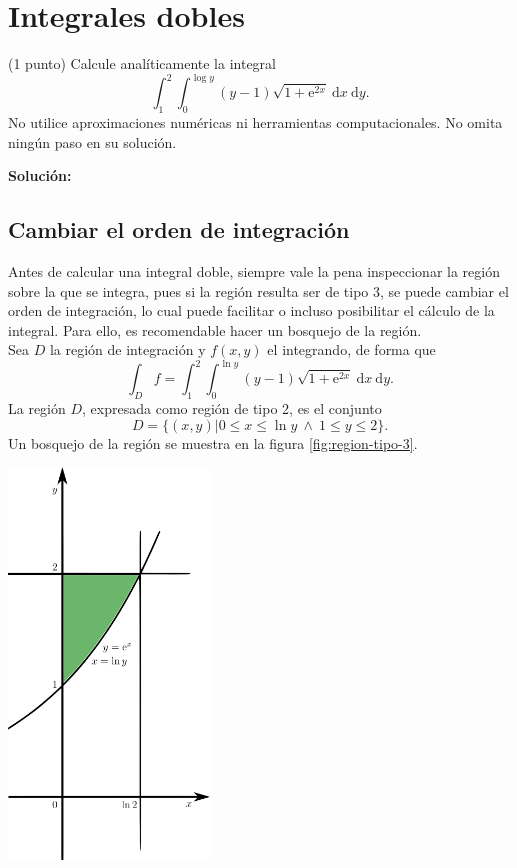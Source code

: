 \documentclass{fmbvecto}
\begin{document}
\section{Integrales dobles}

\begin{problema}
    
    (1 punto) Calcule analíticamente la integral \[ \int_{1}^{2} \int_{0}^{\log y} (y-1) \sqrt{1 + \mathrm{e}^{2x}} \: \mathrm{d}x \: \mathrm{d}y. \] No utilice aproximaciones numéricas ni herramientas computacionales. No omita ningún paso en su solución.


\vspace{1em}
\tcblower
\textbf{Solución:}

    \subsection{Cambiar el orden de integración}

    Antes de calcular una integral doble, siempre vale la pena inspeccionar la región sobre la que se integra, pues si la región resulta ser de tipo 3, se puede cambiar el orden de integración, lo cual puede facilitar o incluso posibilitar el cálculo de la integral. Para ello, es recomendable hacer un bosquejo de la región. \\
    
    Sea \(D\) la región de integración y \(f(x, y)\) el integrando, de forma que \[ \int_D f = \int_{1}^{2} \int_{0}^{\ln y} (y-1) \sqrt{1 + \mathrm{e}^{2x}} \: \mathrm{d}x \: \mathrm{d}y. \]
    La región \(D\), expresada como región de tipo 2, es el conjunto
    \[D = \{(x, y) | 0 \leq x \leq \ln y \ \land \ 1 \leq y \leq 2\}.\]
    Un bosquejo de la región se muestra en la figura \ref{fig:region-tipo-3}.

    \begin{center}
        \includegraphics[width=0.4\textwidth]{region-tipo-3.png}
        \label{fig:region-tipo-3}
    \end{center}


\end{problema}
\end{document}
